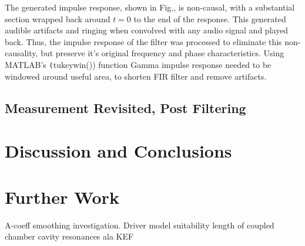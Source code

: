 \documentclass{report}
\begin{document}
            The generated impulse response, shown in Fig., is non-causal, with a substantial section wrapped back around $t=0$ to the end of the response.
            This generated audible artifacts and ringing when convolved with any audio signal and played back.
            Thus, the impulse response of the filter was processed to eliminate this non-causality, but preserve it's original frequency and phase characteristics.
            Using MATLAB's \texttt(tukeywin()) function
            Gamma impulse response needed to be windowed around useful area, to shorten FIR filter and remove artifacts.


    \section{Measurement Revisited, Post Filtering}


\chapter{Discussion and Conclusions}

\chapter{Further Work}
    A-coeff smoothing investigation.
    Driver model suitability
    length of coupled chamber
    cavity resonances ala KEF



\end{document}
